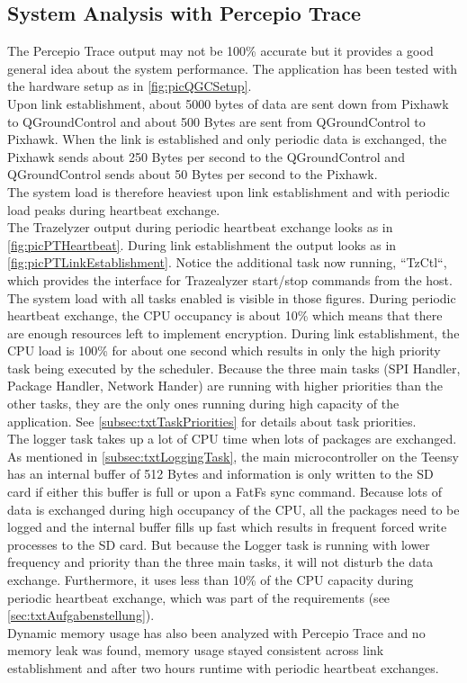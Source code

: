 \subsection{System Analysis with Percepio Trace} \label{subsec:txtPTSystemAnalysis}
The Percepio Trace output may not be 100\% accurate but it provides a good general idea about the system performance. The application has been tested with the hardware setup as in \autoref{fig:picQGCSetup}.\\
Upon link establishment, about 5000 bytes of data are sent down from Pixhawk to QGroundControl and about 500 Bytes are sent from QGroundControl to Pixhawk. When the link is established and only periodic data is exchanged, the Pixhawk sends about 250 Bytes per second to the QGroundControl and QGroundControl sends about 50 Bytes per second to the Pixhawk.\\
The system load is therefore heaviest upon link establishment and with periodic load peaks during heartbeat exchange.\\
The Trazelyzer output during periodic heartbeat exchange looks as in \autoref{fig:picPTHeartbeat}. During link establishment the output looks as in \autoref{fig:picPTLinkEstablishment}. Notice the additional task now running, ``TzCtl``, which provides the interface for Trazealyzer start/stop commands from the host.\\
The system load with all tasks enabled is visible in those figures. During periodic heartbeat exchange, the CPU occupancy is about 10\% which means that there are enough resources left to implement encryption. During link establishment, the CPU load is 100\% for about one second which results in only the high priority task being executed by the scheduler. Because the three main tasks (SPI Handler, Package Handler, Network Hander) are running with higher priorities than the other tasks, they are the only ones running during high capacity of the application. See \autoref{subsec:txtTaskPriorities} for details about task priorities.\\
The logger task takes up a lot of CPU time when lots of packages are exchanged. As mentioned in \autoref{subsec:txtLoggingTask}, the main microcontroller on the Teensy has an internal buffer of 512 Bytes and information is only written to the SD card if either this buffer is full or upon a FatFs sync command. Because lots of data is exchanged during high occupancy of the CPU, all the packages need to be logged and the internal buffer fills up fast which results in frequent forced write processes to the SD card. But because the Logger task is running with lower frequency and priority than the three main tasks, it will not disturb the data exchange. Furthermore, it uses less than 10\% of the CPU capacity during periodic heartbeat exchange, which was part of the requirements (see \autoref{sec:txtAufgabenstellung}).\\
Dynamic memory usage has also been analyzed with Percepio Trace and no memory leak was found, memory usage stayed consistent across link establishment and after two hours runtime with periodic heartbeat exchanges.
%
%
%
